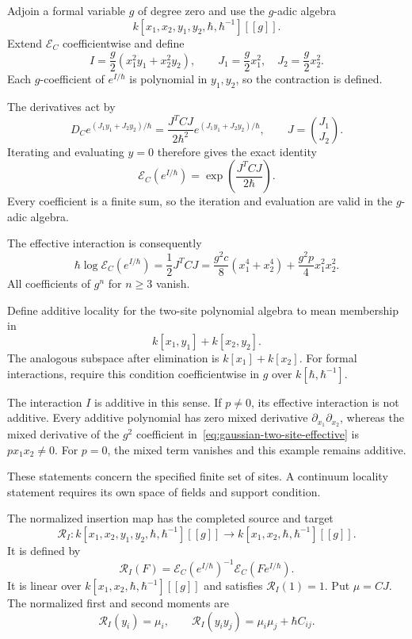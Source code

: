 Adjoin a formal variable $g$ of degree zero and use the $g$-adic algebra
\[
 k[x_1,x_2,y_1,y_2,\hbar,\hbar^{-1}][[g]].
\]
Extend $\mathcal E_C$ coefficientwise and define
\[
 I=\frac g2(x_1^2y_1+x_2^2y_2),\qquad
 J_1=\frac g2x_1^2,\quad J_2=\frac g2x_2^2.
\]
Each $g$-coefficient of $e^{I/\hbar}$ is polynomial in $y_1,y_2$,
so the contraction is defined.

The derivatives act by
\[
 D_C e^{(J_1y_1+J_2y_2)/\hbar}
 =\frac{J^T C J}{2\hbar^2}
       e^{(J_1y_1+J_2y_2)/\hbar},
 \qquad J=\binom{J_1}{J_2}.
\]
Iterating and evaluating $y=0$ therefore gives the exact identity
\[
 \mathcal E_C(e^{I/\hbar})
 =\exp\left(\frac{J^TCJ}{2\hbar}\right).
\]
Every coefficient is a finite sum, so the iteration and evaluation
are valid in the $g$-adic algebra.

The effective interaction is consequently
\begin{equation}\label{eq:gaussian-two-site-effective}
 \hbar\log\mathcal E_C(e^{I/\hbar})
 =\frac12J^TCJ
 =\frac{g^2c}{8}(x_1^4+x_2^4)+\frac{g^2p}{4}x_1^2x_2^2.
\end{equation}
All coefficients of $g^n$ for $n\geq3$ vanish.

Define additive locality for the two-site polynomial algebra to mean
membership in
\[
 k[x_1,y_1]+k[x_2,y_2].
\]
The analogous subspace after elimination is $k[x_1]+k[x_2]$.
For formal interactions, require this condition coefficientwise in $g$
over $k[\hbar,\hbar^{-1}]$.

The interaction $I$ is additive in this sense.
If $p\ne0$, its effective interaction is not additive.
Every additive polynomial has zero mixed derivative
$\partial_{x_1}\partial_{x_2}$, whereas the mixed derivative of
the $g^2$ coefficient in~\eqref{eq:gaussian-two-site-effective} is
$p x_1x_2\ne0$.
For $p=0$, the mixed term vanishes and this example remains additive.

These statements concern the specified finite set of sites.
A continuum locality statement requires its own space of fields and
support condition.

The normalized insertion map has the completed source and target
\[
 \mathcal R_I:
 k[x_1,x_2,y_1,y_2,\hbar,\hbar^{-1}][[g]]
 \longrightarrow k[x_1,x_2,\hbar,\hbar^{-1}][[g]].
\]
It is defined by
\[
 \mathcal R_I(F)
 =\mathcal E_C(e^{I/\hbar})^{-1}\mathcal E_C(F e^{I/\hbar}).
\]
It is linear over $k[x_1,x_2,\hbar,\hbar^{-1}][[g]]$ and satisfies
$\mathcal R_I(1)=1$.
Put $\mu=CJ$. The normalized first and second moments are
\[
 \mathcal R_I(y_i)=\mu_i,\qquad
 \mathcal R_I(y_i y_j)=\mu_i\mu_j+\hbar C_{ij}.
\]


